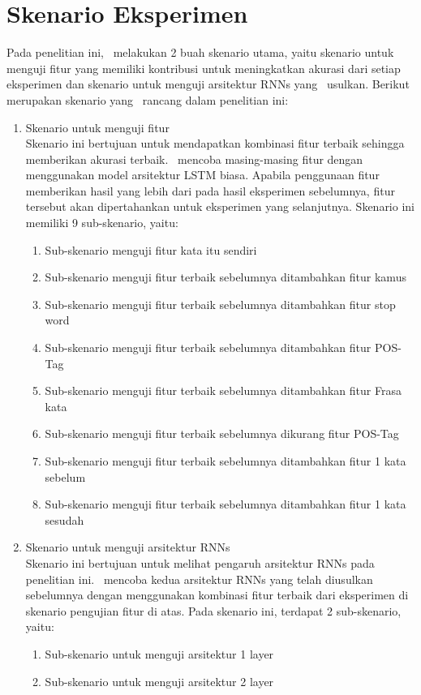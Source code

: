 \section{Skenario Eksperimen}
Pada penelitian ini, \saya~melakukan 2 buah skenario utama, yaitu skenario untuk menguji fitur yang memiliki kontribusi untuk meningkatkan akurasi dari setiap eksperimen dan skenario untuk menguji arsitektur RNNs yang \saya~usulkan. Berikut merupakan skenario yang \saya~rancang dalam penelitian ini:
\begin{enumerate}
	\item Skenario untuk menguji fitur\\
	Skenario ini bertujuan untuk mendapatkan kombinasi fitur terbaik sehingga memberikan akurasi terbaik. \Saya~mencoba masing-masing fitur dengan menggunakan model arsitektur LSTM biasa. Apabila penggunaan fitur memberikan hasil yang lebih dari pada hasil eksperimen sebelumnya, fitur tersebut akan dipertahankan untuk eksperimen yang selanjutnya. Skenario ini memiliki 9 sub-skenario, yaitu:
	\begin{enumerate}
		\item Sub-skenario menguji fitur kata itu sendiri
		\item Sub-skenario menguji fitur terbaik sebelumnya ditambahkan fitur kamus
		\item Sub-skenario menguji fitur terbaik sebelumnya ditambahkan fitur stop word
		\item Sub-skenario menguji fitur terbaik sebelumnya ditambahkan fitur POS-Tag
		\item Sub-skenario menguji fitur terbaik sebelumnya ditambahkan fitur Frasa kata
		\item Sub-skenario menguji fitur terbaik sebelumnya dikurang fitur POS-Tag
		\item Sub-skenario menguji fitur terbaik sebelumnya ditambahkan fitur 1 kata sebelum
		\item Sub-skenario menguji fitur terbaik sebelumnya ditambahkan fitur 1 kata sesudah
	\end{enumerate}
	\item Skenario untuk menguji arsitektur RNNs\\
	Skenario ini bertujuan untuk melihat pengaruh arsitektur RNNs pada penelitian ini. \Saya~mencoba kedua arsitektur RNNs yang telah diusulkan sebelumnya dengan menggunakan kombinasi fitur terbaik dari eksperimen di skenario pengujian fitur di atas. Pada skenario ini, terdapat 2 sub-skenario, yaitu:
	\begin{enumerate}
		\item Sub-skenario untuk menguji arsitektur 1 layer
		\item Sub-skenario untuk menguji arsitektur 2 layer
	\end{enumerate}
	
\end{enumerate}

